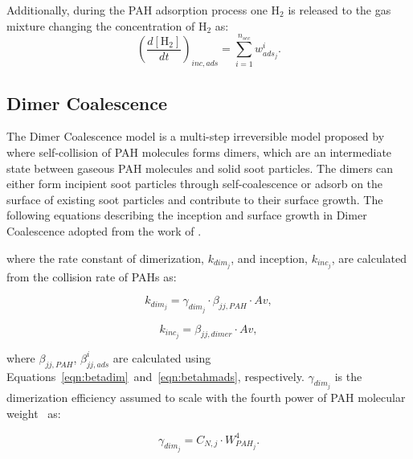 Additionally, during the PAH adsorption process one $\mathrm{H_2}$ is released to the gas mixture changing the concentration of $\mathrm{H_2}$ as:
\begin{equation}
	\left(
	\frac{d\left[{\mathrm{H_2}}\right]}{dt}
	\right)_{inc, ads}
	= 
	\sum_{i=1}^{n_{sec}}w^i_{ads_j}
	\label{eqn:H2scrub_reacdim}.
\end{equation}

\subsection{Dimer Coalescence}
\label{sec:dimcoal}
The Dimer Coalescence model is a multi-step irreversible model proposed by \citet{blanquart2009joint} where self-collision of PAH molecules forms dimers, which are an intermediate state between gaseous PAH molecules and solid soot particles. The dimers can either form incipient soot particles through self-coalescence or adsorb on the surface of existing soot particles and contribute to their surface growth. The following equations describing the inception and surface growth in Dimer Coalescence adopted from the work of \citet{sun2021modelling}.


\noindent where the rate constant of dimerization, ${k_{dim_{j}}}$, and inception, ${k_{inc_{j}}}$, are calculated from the collision rate of PAHs as:

\begin{equation}
	k_{dim_{j}}=
	\gamma_{dim_j}\cdot\beta_{jj,PAH}\cdot Av
	\label{eqn:kdim_dimcoal},
\end{equation}

\begin{equation}
	k_{inc_{j}}=
	\beta_{jj,dimer}\cdot Av
	\label{eqn:kinc_dimcoal},
\end{equation}

\noindent where $\beta_{jj,PAH}$, $\beta^i_{jj,ads}$ are calculated using Equations~\eqref{eqn:betadim}~and~\eqref{eqn:betahmads}, respectively. $\gamma_{dim_j}$ is the dimerization efficiency assumed to scale with the fourth power of PAH molecular weight~\cite{blanquart2009analyzing} as:

\begin{equation}
	\gamma_{dim_j}=
	C_{N,j}\cdot W_{PAH_j}^4.
	\label{eqn:gamma_dimcoal}
\end{equation} 

